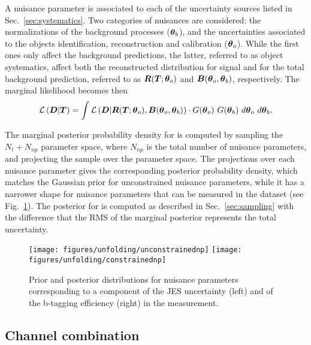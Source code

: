 A nuisance parameter is associated to each of the uncertainty sources
listed in Sec.~\ref{sec:systematics}. Two categories of nuisances
are considered: the normalizations of the background processes
($\boldsymbol{\theta}{}_b$), and the uncertainties associated to the objects
identification, reconstruction and calibration ($\boldsymbol{\theta}{}_o$).
While the first ones only affect the background predictions, the
latter, referred to as object systematics, affect both the
reconstructed distribution for \ttbar{} signal and for
the total background prediction, referred to as
$\boldsymbol{R}{}(\boldsymbol{T}{};\boldsymbol{\theta}{}_o)$ and
$\boldsymbol{B}{}(\boldsymbol{\theta}{}_o,\boldsymbol{\theta}{}_b)$, respectively.
The marginal likelihood becomes then
\begin{equation}
\label{eq:marginalLhood}
  \mathcal{L}\left(\boldsymbol{D}{}|\boldsymbol{T}{}\right)=
  \int
  \mathcal{L}\left(\boldsymbol{D}{}|\boldsymbol{R}{}(\boldsymbol{T}{};\boldsymbol{\theta}{}_o),\boldsymbol{B}{}(\boldsymbol{\theta}{}_o,\boldsymbol{\theta}{}_b)\right) 
  \cdot{} G(\boldsymbol{\theta}{}_o) ~G(\boldsymbol{\theta}{}_b)
  ~d\boldsymbol{\theta}{}_o ~d\boldsymbol{\theta}{}_b.
\end{equation}

The marginal posterior probability density for \Truth{} is computed by
sampling the $N_t+N_{np}$ parameter space, where $N_{np}$ is the
total number of nuisance parameters, and projecting the sample over
the \Truth{} parameter space. The projections over each nuisance
parameter gives the corresponding posterior probability density,
which matches the Gaussian prior for unconstrained nuisance
parameters, while it has a narrower shape for nuisance parameters
that can be measured in the dataset (see Fig.~\ref{fig:nuispar}).
The posterior for \ac{} is computed as described in
Sec.~\ref{sec:sampling} with the difference that the RMS of the
marginal posterior represents the total uncertainty.

\begin{figure}[!htb]\centering
  \texttt{[image: figures/unfolding/unconstrainednp]}
  \texttt{[image: figures/unfolding/constrainednp]}
  \caption{Prior and posterior distributions for nuisance parameters
    corresponding to a component of the JES uncertainty (left) and of
    the b-tagging efficiency (right) in the \eighttev{} measurement.}
  \label{fig:nuispar}
\end{figure}

\subsection{Channel combination}

